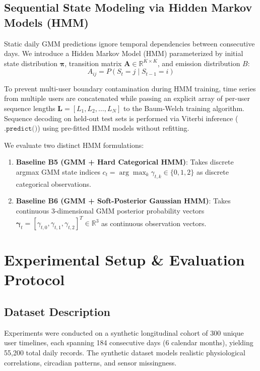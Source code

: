 \documentclass[conference]{IEEEtran}
\begin{document}
\subsection{Sequential State Modeling via Hidden Markov Models (HMM)}
Static daily GMM predictions ignore temporal dependencies between consecutive days. We introduce a Hidden Markov Model (HMM) parameterized by initial state distribution $\boldsymbol{\pi}$, transition matrix $\mathbf{A} \in \mathbb{R}^{K \times K}$, and emission distribution $B$:
\begin{equation}
A_{ij} = P(S_t = j \mid S_{t-1} = i) \label{eq_transmat}
\end{equation}

To prevent multi-user boundary contamination during HMM training, time series from multiple users are concatenated while passing an explicit array of per-user sequence lengths $\mathbf{L} = [L_1, L_2, \dots, L_N]$ to the Baum-Welch training algorithm. Sequence decoding on held-out test sets is performed via Viterbi inference ($\texttt{.predict()}$) using pre-fitted HMM models without refitting.

We evaluate two distinct HMM formulations:
\begin{enumerate}
    \item \textbf{Baseline B5 (GMM + Hard Categorical HMM)}: Takes discrete argmax GMM state indices $c_t = \arg\max_k \gamma_{t,k} \in \{0, 1, 2\}$ as discrete categorical observations.
    \item \textbf{Baseline B6 (GMM + Soft-Posterior Gaussian HMM)}: Takes continuous 3-dimensional GMM posterior probability vectors $\boldsymbol{\gamma}_t = [\gamma_{t,0}, \gamma_{t,1}, \gamma_{t,2}]^T \in \mathbb{R}^3$ as continuous observation vectors.
\end{enumerate}

\section{Experimental Setup \& Evaluation Protocol}

\subsection{Dataset Description}
Experiments were conducted on a synthetic longitudinal cohort of 300 unique user timelines, each spanning 184 consecutive days (6 calendar months), yielding 55,200 total daily records. The synthetic dataset models realistic physiological correlations, circadian patterns, and sensor missingness.
\end{document}
